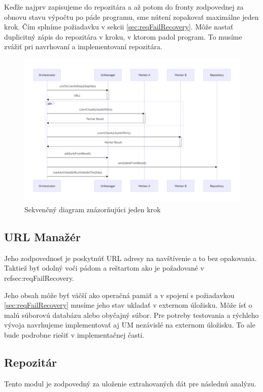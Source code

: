 Keďže najprv zapisujeme do repozitára a až potom do fronty zodpovednej za obnovu stavu výpočtu po páde programu, sme nútení zopakovať maximálne jeden krok. Čím splníme požiadavku v sekcii \ref{sec:reqFailRecovery}. Môže nastať duplicitný zápis do repozitára v kroku, v ktorom padol program. To musíme zvážiť pri navrhovaní a implementovaní repozitára. 

\begin{figure}[!ht]
    \centering
    \includegraphics[width=.9\textwidth]{figures/seqDiagCrawlStep.png}
    \caption{ Sekvenčný diagram znázorňujúci jeden krok \label{o:seqDiagCrawlStep}}
\end{figure}



\subsection{URL Manažér}
Jeho zodpovednosť je poskytnúť URL adresy na navštívenie a to bez opakovania. Taktiež byť odolný voči pádom a reštartom ako je požadované v ref{sec:reqFailRecovery}.

Jeho obsah môže byť väčší ako operačná pamäť a v spojení s požiadavkou \ref{sec:reqFailRecovery} musíme jeho stav ukladať v externom úložisku. Môže ísť o malú súborovú databázu alebo obyčajný súbor. Pre potreby testovania a rýchleho vývoja navrhujeme implementovať aj UM nezávislé na externom úložisku. To ale bude podrobne riešiť v implementačnej časti. 




\subsection{Repozitár}
Tento modul je zodpovedný za uloženie extrahovaných dát pre následnú analýzu. 

